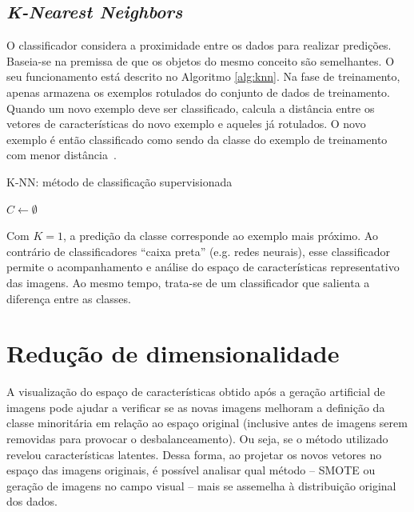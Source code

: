 \subsection{\textit{K-Nearest Neighbors}}
\label{sec:knn}

O classificador  considera a proximidade entre os dados para realizar predições. Baseia-se na premissa de que os objetos do mesmo conceito são semelhantes. O seu funcionamento está descrito no Algoritmo \ref{alg:knn}. Na fase de treinamento, apenas armazena os exemplos rotulados do conjunto de dados de treinamento. Quando um novo exemplo deve ser classificado, calcula a distância entre os vetores de características do novo exemplo e aqueles já rotulados. O novo exemplo é então classificado como sendo da classe do exemplo de treinamento com menor distância~\cite{Boiman2008}.

\begin{algorithm}[!htbp]
  \caption{K-NN: método de classificação supervisionada}
  \label{alg:knn}
  \SetAlgoLined
  $C \gets \emptyset $\;
\end{algorithm}

Com $K = 1$, a predição da classe corresponde ao exemplo mais próximo. Ao contrário de classificadores ``caixa preta'' (e.g. redes neurais), esse classificador permite o acompanhamento e análise do espaço de características representativo das imagens. Ao mesmo tempo, trata-se de um classificador que salienta a diferença entre as classes.


\section{Redução de dimensionalidade}
\label{sec:reducaodimensionalidade}

A visualização do espaço de características obtido após a geração artificial de imagens pode ajudar a verificar se as novas imagens melhoram a definição da classe minoritária em relação ao espaço original (inclusive antes de imagens serem removidas para provocar o desbalanceamento). Ou seja, se o método utilizado revelou características latentes. Dessa forma, ao projetar os novos vetores no espaço das imagens originais, é possível analisar qual método -- SMOTE ou geração de imagens no campo visual -- mais se assemelha à distribuição original dos dados.

